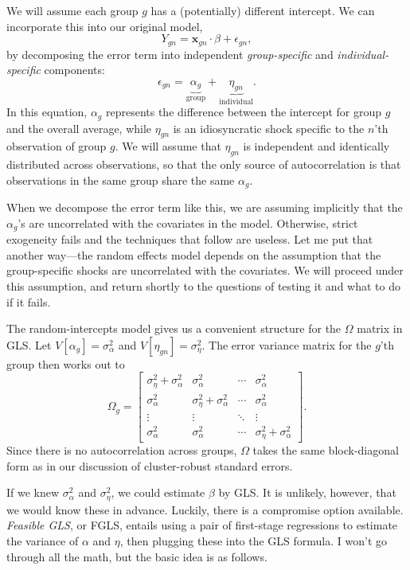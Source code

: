\documentclass[
  12pt,
  oneside,openany]{book}
\begin{document}
We will assume each group \(g\) has a (potentially) different intercept. We can incorporate this into our original model,
\[
Y_{gn} = \mathbf{x}_{gn} \cdot \beta + \epsilon_{gn},
\]
by decomposing the error term into independent \emph{group-specific} and \emph{individual-specific} components:
\[
\epsilon_{gn} = \underbrace{\alpha_g}_{\text{group}} + \underbrace{\eta_{gn}}_{\text{individual}}.
\]
In this equation, \(\alpha_g\) represents the difference between the intercept for group \(g\) and the overall average, while \(\eta_{gn}\) is an idiosyncratic shock specific to the \(n\)'th observation of group \(g\). We will assume that \(\eta_{gn}\) is independent and identically distributed across observations, so that the only source of autocorrelation is that observations in the same group share the same \(\alpha_g\).

When we decompose the error term like this, we are assuming implicitly that the \(\alpha_g\)'s are uncorrelated with the covariates in the model. Otherwise, strict exogeneity fails and the techniques that follow are useless. Let me put that another way---the random effects model depends on the assumption that the group-specific shocks are uncorrelated with the covariates. We will proceed under this assumption, and return shortly to the questions of testing it and what to do if it fails.

The random-intercepts model gives us a convenient structure for the \(\Omega\) matrix in GLS. Let \(V[\alpha_g] = \sigma^2_\alpha\) and \(V[\eta_{gn}] = \sigma^2_\eta\). The error variance matrix for the \(g\)'th group then works out to
\[
\Omega_g = \begin{bmatrix}
\sigma_{\eta}^2 + \sigma_{\alpha}^2 & \sigma_{\alpha}^2 & \cdots & \sigma_{\alpha}^2 \\
\sigma_{\alpha}^2 & \sigma_{\eta}^2 + \sigma_{\alpha}^2 & \cdots & \sigma_{\alpha}^2 \\
\vdots & \vdots & \ddots & \vdots \\
\sigma_{\alpha}^2 & \sigma_{\alpha}^2 & \cdots & \sigma_{\eta}^2 + \sigma_{\alpha}^2
\end{bmatrix}.
\]
Since there is no autocorrelation across groups, \(\Omega\) takes the same block-diagonal form as in our discussion of cluster-robust standard errors.

If we knew \(\sigma^2_\alpha\) and \(\sigma^2_\eta\), we could estimate \(\beta\) by GLS. It is unlikely, however, that we would know these in advance. Luckily, there is a compromise option available. \emph{Feasible GLS}, or FGLS, entails using a pair of first-stage regressions to estimate the variance of \(\alpha\) and \(\eta\), then plugging these into the GLS formula. I won't go through all the math, but the basic idea is as follows.
\end{document}
